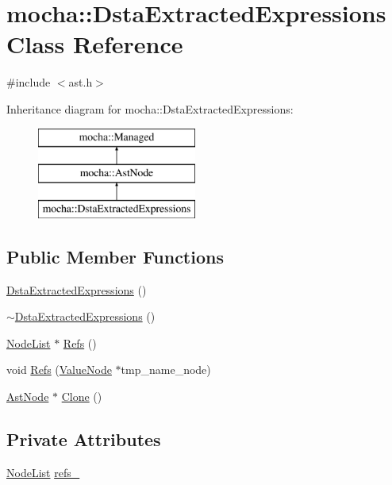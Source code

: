 \hypertarget{classmocha_1_1_dsta_extracted_expressions}{
\section{mocha::DstaExtractedExpressions Class Reference}
\label{classmocha_1_1_dsta_extracted_expressions}
}


{\ttfamily \#include $<$ast.h$>$}

Inheritance diagram for mocha::DstaExtractedExpressions:\begin{figure}[H]
\begin{center}
\leavevmode
\includegraphics[height=3.000000cm]{classmocha_1_1_dsta_extracted_expressions}
\end{center}
\end{figure}
\subsection*{Public Member Functions}
\begin{DoxyCompactItemize}
\item 
\hyperlink{classmocha_1_1_dsta_extracted_expressions_af71f260e2dfd5864ed89a2e302e55f88}{DstaExtractedExpressions} ()
\item 
\hyperlink{classmocha_1_1_dsta_extracted_expressions_aaf65c329a0d548a436083232ec217734}{$\sim$DstaExtractedExpressions} ()
\item 
\hyperlink{classmocha_1_1_node_list}{NodeList} $\ast$ \hyperlink{classmocha_1_1_dsta_extracted_expressions_afda6e6826138e547c3cb524e33eb16f9}{Refs} ()
\item 
void \hyperlink{classmocha_1_1_dsta_extracted_expressions_a5485d44c44690f8170fa5516e1a6ea9f}{Refs} (\hyperlink{classmocha_1_1_value_node}{ValueNode} $\ast$tmp\_\-name\_\-node)
\item 
\hyperlink{classmocha_1_1_ast_node}{AstNode} $\ast$ \hyperlink{classmocha_1_1_dsta_extracted_expressions_ac736af5060a210d5d7a34bce3365d5cb}{Clone} ()
\end{DoxyCompactItemize}
\subsection*{Private Attributes}
\begin{DoxyCompactItemize}
\item 
\hyperlink{classmocha_1_1_node_list}{NodeList} \hyperlink{classmocha_1_1_dsta_extracted_expressions_affd0c1b4b44c87f27b6428da20e25928}{refs\_\-}
\end{DoxyCompactItemize}


